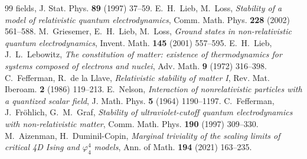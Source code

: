 \documentclass[11pt]{article}
\theoremstyle{definition}
\theoremstyle{remark}
\begin{document}
\begin{thebibliography}{99}
{fields}, J. Stat. Phys. \textbf{89} (1997) 37--59.
 E.~H.~Lieb, M.~Loss, \emph{Stability of a model of
relativistic quantum electrodynamics}, Comm. Math. Phys. \textbf{228}
(2002) 561--588.
 M.~Griesemer, E.~H.~Lieb, M.~Loss, \emph{Ground states in
non-relativistic quantum electrodynamics}, Invent. Math. \textbf{145}
(2001) 557--595.
 E.~H.~Lieb, J.~L.~Lebowitz, \emph{The
constitution of matter: existence of thermodynamics for systems composed
of electrons and nuclei}, Adv. Math. \textbf{9} (1972) 316--398.
 C.~Fefferman, R.~de la Llave, \emph{Relativistic
stability of matter I}, Rev. Mat. Iberoam. \textbf{2} (1986) 119--213.
 E.~Nelson, \emph{Interaction of nonrelativistic
particles with a quantized scalar field}, J. Math. Phys. \textbf{5}
(1964) 1190--1197.
 C.~Fefferman, J.~Fr\"ohlich, G.~M.~Graf, \emph{Stability
of ultraviolet-cutoff quantum electrodynamics with non-relativistic
matter}, Comm. Math. Phys. \textbf{190} (1997) 309--330.
 M.~Aizenman, H.~Duminil-Copin, \emph{Marginal triviality
of the scaling limits of critical 4D Ising and $\varphi^4_4$ models},
Ann. of Math. \textbf{194} (2021) 163--235.
\end{thebibliography}
\end{document}
